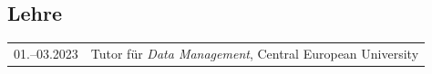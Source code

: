 \subsection*{Lehre}
\begin{longtable}[l]{@{}p{} p{}}
\mbox{01.--03.2023} & Tutor für \emph{Data Management}, Central European University\\
\end{longtable}

